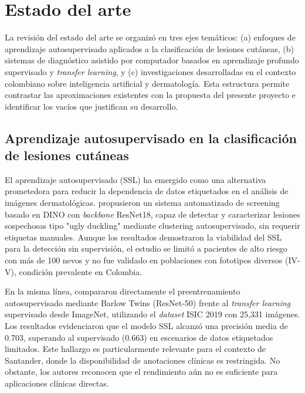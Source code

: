 \chapter{Estado del arte}

 La revisión del estado del arte se organizó en tres ejes temáticos: (a) enfoques de aprendizaje autosupervisado aplicados a la clasificación de lesiones cutáneas, (b) sistemas de diagnóstico asistido por computador basados en aprendizaje profundo supervisado y \textit{transfer learning}, y (c) investigaciones desarrolladas en el contexto colombiano sobre inteligencia artificial y dermatología. Esta estructura permite contrastar las aproximaciones existentes con la propuesta del presente proyecto e identificar los vacíos que justifican su desarrollo.

\section{Aprendizaje autosupervisado en la clasificación de lesiones cutáneas}

 El aprendizaje autosupervisado (SSL) ha emergido como una alternativa prometedora para reducir la dependencia de datos etiquetados en el análisis de imágenes dermatológicas. \textcite{useini2024automatizedSSL} propusieron un sistema automatizado de screening basado en DINO con \textit{backbone} ResNet18, capaz de detectar y caracterizar lesiones sospechosas tipo "ugly duckling" mediante clustering autosupervisado, sin requerir etiquetas manuales. Aunque los resultados demostraron la viabilidad del SSL para la detección sin supervisión, el estudio se limitó a pacientes de alto riesgo con más de 100 nevos y no fue validado en poblaciones con fototipos diversos (IV-V), condición prevalente en Colombia.

En la misma línea, \textcite{harczos2024barlowtwinsisic} compararon directamente el preentrenamiento autosupervisado mediante Barlow Twins (ResNet-50) frente al \textit{transfer learning} supervisado desde ImageNet, utilizando el \textit{dataset} ISIC 2019 con 25,331 imágenes. Los resultados evidenciaron que el modelo SSL alcanzó una precisión media de 0.703, superando al supervisado (0.663) en escenarios de datos etiquetados limitados. Este hallazgo es particularmente relevante para el contexto de Santander, donde la disponibilidad de anotaciones clínicas es restringida. No obstante, los autores reconocen que el rendimiento aún no es suficiente para aplicaciones clínicas directas.

